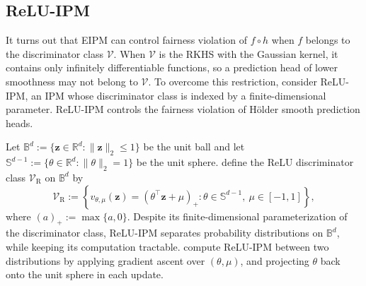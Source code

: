 \documentclass{article} %
\begin{document}
\subsection{ReLU-IPM}
\label{sec:relu-ipm}

It turns out that EIPM can control fairness violation of $f \circ h$  when $f$ belongs to the discriminator class $\mathcal{V}$.
When $\mathcal{V}$ is the RKHS with the Gaussian kernel, it contains only infinitely differentiable functions, so a prediction head of lower smoothness may not belong to $\mathcal{V}$.  
To overcome this restriction, \citet{park2026relu} consider ReLU-IPM, an IPM whose discriminator class is indexed by a finite-dimensional parameter. ReLU-IPM controls the fairness violation of H\"older smooth prediction heads.

Let $\mathbb{B}^d:=\{\mathbf{z}\in\mathbb{R}^d:\lVert \mathbf{z}\rVert_2\le 1\}$ be the unit ball and let $\mathbb{S}^{d-1}:=\{\theta\in\mathbb{R}^d:\lVert\theta\rVert_2=1\}$ be the unit sphere. \citet{park2026relu} define the ReLU discriminator class $\mathcal{V}_{\mathrm{R}}$ on $\mathbb{B}^d$ by
\begin{equation}
  \mathcal{V}_{\mathrm{R}}
  :=\left\{
    v_{\theta,\mu}(\mathbf{z})=(\theta^\top \mathbf{z}+\mu)_+:
    \theta\in\mathbb{S}^{d-1},\ \mu\in[-1,1]
  \right\},
  \label{eq:relu-class}
\end{equation}
where $(a)_+:=\max\{a,0\}$.  
Despite its finite-dimensional parameterization of the discriminator class, ReLU-IPM separates probability distributions on $\mathbb{B}^d$, while keeping its computation tractable.
\citet{park2026relu} compute ReLU-IPM between two distributions by applying gradient ascent over $(\theta,\mu)$,  and projecting $\theta$ back onto the unit sphere in each update.
\end{document}
